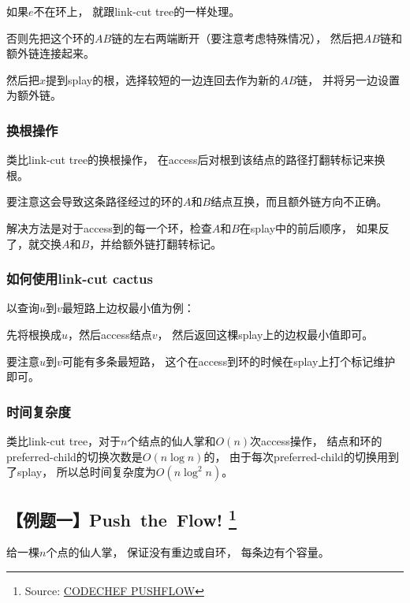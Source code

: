 \documentclass{noithesis}
\begin{document}
如果$e$不在环上，
就跟link-cut tree的一样处理。

否则先把这个环的$A B$链的左右两端断开（要注意考虑特殊情况），
然后把$A B$链和额外链连接起来。

然后把$x$提到splay的根，选择较短的一边连回去作为新的$A B$链，
并将另一边设置为额外链。



\subsubsection{换根操作}

类比link-cut tree的换根操作，
在access后对根到该结点的路径打翻转标记来换根。

要注意这会导致这条路径经过的环的$A$和$B$结点互换，而且额外链方向不正确。

解决方法是对于access到的每一个环，检查$A$和$B$在splay中的前后顺序，
如果反了，就交换$A$和$B$，并给额外链打翻转标记。



\subsubsection{如何使用link-cut cactus}

以查询$u$到$v$最短路上边权最小值为例：

先将根换成$u$，然后access结点$v$，
然后返回这棵splay上的边权最小值即可。

要注意$u$到$v$可能有多条最短路，
这个在access到环的时候在splay上打个标记维护即可。


\subsubsection{时间复杂度}

类比link-cut tree，对于$n$个结点的仙人掌和$O(n)$次access操作，
结点和环的preferred-child的切换次数是$O(n \log n)$的，
由于每次preferred-child的切换用到了splay，
所以总时间复杂度为$O(n \log ^ 2 n)$。





\subsection{【例题一】Push\ the\ Flow! \protect \footnote{Source: \href{http://www.codechef.com/problems/PUSHFLOW}{CODECHEF PUSHFLOW}} }

给一棵$n$个点的仙人掌，
保证没有重边或自环，
每条边有个容量。
\end{document}
